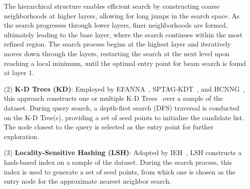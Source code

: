 \begin{table}[ht]
\centering
\caption{Distribution of Nodes Across Hierarchical Layers Based on Outdegree \(M\)}
\label{tab:layer_distribution}
\end{table}

The hierarchical structure enables efficient search by constructing coarse neighborhoods at higher layers, allowing for long jumps in the search space. As the search progresses through lower layers, finer neighborhoods are formed, ultimately leading to the base layer, where the search continues within the most refined region. The search process begins at the highest layer and iteratively moves down through the layers, restarting the search at the next level upon reaching a local minimum, until the optimal entry point for beam search is found at layer 1.

\noindent (2) \textbf{K-D Trees (KD)}: Employed by EFANNA~\cite{efanna}, SPTAG-KDT~\cite{SPTAG2}, and HCNNG~\cite{hcnng}, this approach constructs one or multiple K-D Trees~\cite{kdtree} over a sample of the dataset. During query search, a depth-first search (DFS) traversal is conducted on the K-D Tree(s), providing a set of seed points to initialize the candidate list. The node closest to the query is selected as the entry point for further exploration.

\noindent (3) \textbf{Locality-Sensitive Hashing (LSH)}: Adopted by IEH~\cite{ieh}, LSH constructs a hash-based index on a sample of the dataset. During the search process, this index is used to generate a set of seed points, from which one is chosen as the entry node for the approximate nearest neighbor search.

